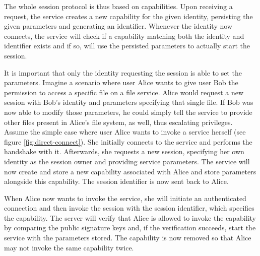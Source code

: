 The whole session protocol is thus based on capabilities.
Upon receiving a request, the service creates a new capability for the given identity, persisting the given parameters and generating an identifier.
Whenever the identity now connects, the service will check if a capability matching both the identity and identifier exists and if so, will use the persisted parameters to actually start the session.

It is important that only the identity requesting the session is able to set the parameters.
Imagine a scenario where user Alice wants to give user Bob the permission to access a specific file on a file service.
Alice would request a new session with Bob's identity and parameters specifying that single file.
If Bob was now able to modify those parameters, he could simply tell the service to provide other files present in Alice's file system, as well, thus escalating privileges.\\

Assume the simple case where user Alice wants to invoke a service herself (see figure \ref{fig:direct-connect}).
She initially connects to the service and performs the handshake with it.
Afterwards, she requests a new session, specifying her own identity as the session owner and providing service parameters.
The service will now create and store a new capability associated with Alice and store parameters alongside this capability.
The session identifier is now sent back to Alice.

When Alice now wants to invoke the service, she will initiate an authenticated connection and then invoke the session with the session identifier, which specifies the capability.
The server will verify that Alice is allowed to invoke the capability by comparing the public signature keys and, if the verification succeeds, start the service with the parameters stored.
The capability is now removed so that Alice may not invoke the same capability twice.

